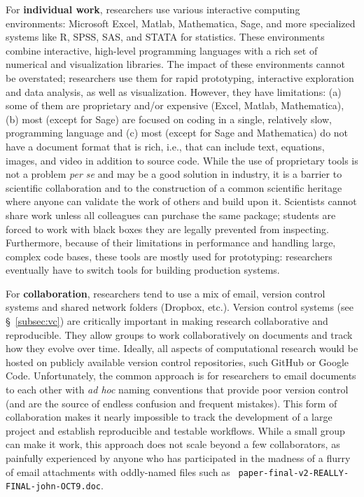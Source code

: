 \documentclass[11pt,oneside,english]{article}
\begin{document}
For \textbf{individual work}, researchers use various interactive computing
environments: Microsoft Excel, Matlab, Mathematica, Sage, and more specialized
systems like R, SPSS, SAS, and STATA for statistics. These environments combine
interactive, high-level programming languages with a rich set of numerical and
visualization libraries. The impact of these environments cannot be overstated;
researchers use them for rapid prototyping, interactive exploration and data
analysis, as well as visualization. However, they have limitations: (a) some of
them are proprietary and/or expensive (Excel, Matlab, Mathematica), (b) most
(except for Sage) are focused on coding in a single, relatively slow,
programming language and (c) most (except for Sage and Mathematica) do not have
a document format that is rich, i.e., that can include text, equations, images,
and video in addition to source code. While the use of proprietary tools is not
a problem \emph{per se} and may be a good solution in industry, it is a barrier
to scientific collaboration and to the construction of a common scientific
heritage where anyone can validate the work of others and build upon it.
Scientists cannot share work unless all colleagues can purchase the same
package; students are forced to work with black boxes they are legally
prevented from inspecting. Furthermore, because of their limitations in
performance and handling large, complex code bases, these tools are mostly used
for prototyping: researchers eventually have to switch tools for building
production systems.

For \textbf{collaboration}, researchers tend to use a mix of email, version
control systems and shared network folders (Dropbox, etc.).  Version control
systems (see §~\ref{subsec:vc}) are critically important in making research
collaborative and reproducible. They allow groups to work collaboratively on
documents and track how they evolve over time. Ideally, all aspects of
computational research would be hosted on publicly available version control
repositories, such GitHub or Google Code. Unfortunately, the common approach is
for researchers to email documents to each other with \emph{ad hoc} naming
conventions that provide poor version control (and are the source of endless
confusion and frequent mistakes). This form of collaboration makes it nearly
impossible to track the development of a large project and establish
reproducible and testable workflows.  While a small group can make it work,
this approach does not scale beyond a few collaborators, as painfully
experienced by anyone who has participated in the madness of a flurry of email
attachments with oddly-named files such as {\tt
paper-final-v2-REALLY-FINAL-john-OCT9.doc}.
\end{document}
